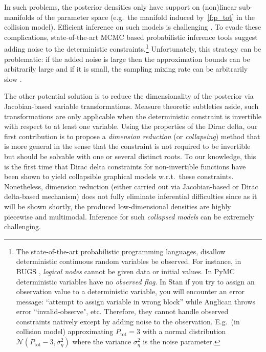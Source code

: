 \documentclass[letterpaper]{article}
\begin{document}
 

In such problems, the posterior densities only have support on (non)linear sub-manifolds of the parameter space (e.g.\ the manifold induced by~\eqref{f:p_tot} in the collision model). 
Efficient inference on such models is challenging \cite{pennec2006intrinsic}. 
To evade these complications, state-of-the-art MCMC based probabilistic inference tools suggest adding noise to the deterministic constraints.\footnote{
%
The state-of-the-art probabilistic programming languages, disallow deterministic continuous random variables be observed. For instance, in BUGS \cite{lunn2009bugs}, \emph{logical nodes} cannot be given data or initial values. 
In PyMC \cite{patil2010pymc} deterministic variables have no \emph{observed flag}. 
In Stan \cite{stan-manual:2014} if you try to assign an observation value to a deterministic variable, you will encounter an error message: ``attempt to assign variable in wrong block'' while Anglican \cite{wood2014new} throws error ``invalid-observe", etc.
Therefore, they cannot handle observed constraints natively except by adding noise to the observation.
E.g.\  (in collision model) approximating $P_{\text{tot}} = 3$ with a normal distribution {\footnotesize $\mathcal{N}( P_{\text{tot}} - 3, \sigma_\eta^2)$} where the variance $\sigma_\eta^2$ is the noise parameter.}
%
Unfortunately, this strategy can be problematic: if the added noise is large then the approximation bounds can be arbitrarily large and if it is small, the sampling mixing rate can be arbitrarily slow \cite{li2013dynamic,chin1987bayesian}. 
 
The other potential solution is to reduce the dimensionality of the posterior via Jacobian-based variable transformations. Measure theoretic subtleties aside, such transformations are only applicable when the deterministic constraint is invertible with respect to at least one variable. Using the properties of the Dirac delta, our first contribution is to propose a \emph{dimension reduction} (or \emph{collapsing}) method that is more general in the sense that the constraint is not required to be invertible but should be solvable with one or several distinct roots. To our knowledge, this is the first time that Dirac delta constraints for non-invertible functions have been shown to yield collapsible graphical models w.r.t.\ these constraints.
Nonetheless, dimension reduction (either carried out via Jacobian-based or Dirac delta-based mechanism) does not fully eliminate inferential difficulties since as it will be shown shortly, the produced low-dimensional densities are highly piecewise and multimodal. 
Inference for such \emph{collapsed models} can be extremely challenging. 
\end{document}
